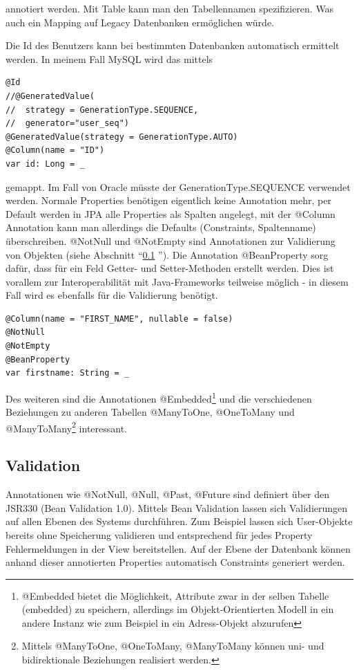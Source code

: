 annotiert werden. Mit Table kann man den Tabellennamen spezifizieren. Was auch ein Mapping auf Legacy Datenbanken erm\"oglichen w\"urde.

Die Id des Benutzers kann bei bestimmten Datenbanken automatisch ermittelt werden. In meinem Fall MySQL wird das mittels 
\begin{lstlisting}[caption=User: ScalaJPA Id mit Auto-Increment]
@Id
//@GeneratedValue(
//	strategy = GenerationType.SEQUENCE, 
//	generator="user_seq")
@GeneratedValue(strategy = GenerationType.AUTO)
@Column(name = "ID")
var id: Long = _
\end{lstlisting}
gemappt. Im Fall von Oracle m\"usste der GenerationType.SEQUENCE verwendet werden.
Normale Properties ben\"otigen eigentlich keine Annotation mehr, per Default werden in JPA alle Properties als Spalten angelegt, mit der @Column Annotation kann man allerdings die Defaults (Constraints, Spaltenname) \"uberschreiben. @NotNull und @NotEmpty sind Annotationen zur Validierung von Objekten (siehe Abschnitt ``\ref{jpa:validation} ''). Die Annotation @BeanProperty sorg daf\"ur, dass f\"ur ein Feld Getter- und Setter-Methoden erstellt werden. Dies ist vorallem zur Interoperabilit\"at mit Java-Frameworks teilweise m\"oglich - in diesem Fall wird es ebenfalls f\"ur die Validierung ben\"otigt. 
\begin{lstlisting}[caption=User: ScalaJPA firstname Mapping]
@Column(name = "FIRST_NAME", nullable = false)
@NotNull
@NotEmpty
@BeanProperty
var firstname: String = _
\end{lstlisting}

Des weiteren sind die Annotationen @Embedded\footnote{@Embedded bietet die M\"oglichkeit, Attribute zwar in der selben Tabelle (embedded) zu speichern, allerdings im Objekt-Orientierten Modell in ein andere Instanz wie zum Beispiel in ein Adress-Objekt abzurufen} und die verschiedenen Beziehungen zu anderen Tabellen @ManyToOne, @OneToMany und @ManyToMany\footnote{Mittels @ManyToOne, @OneToMany, @ManyToMany k\"onnen uni- und bidirektionale Beziehungen realisiert werden.} interessant. 



\subsection{Validation}\label{jpa:validation}
Annotationen wie @NotNull, @Null, @Past, @Future sind definiert \"uber den JSR330 (Bean Validation 1.0). Mittels Bean Validation lassen sich Validierungen auf allen Ebenen des Systems durchf\"uhren. Zum Beispiel lassen sich User-Objekte bereits ohne Speicherung validieren und entsprechend f\"ur jedes Property Fehlermeldungen in der View bereitstellen. Auf der Ebene der Datenbank k\"onnen anhand dieser annotierten Properties automatisch Constraints  generiert werden.

